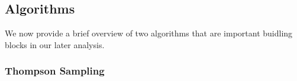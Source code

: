 

\subsection{Algorithms}

We now provide a brief overview of two algorithms that are important buidling blocks in our later analysis. 

\subsubsection{Thompson Sampling}

